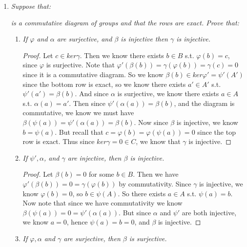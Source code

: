 \documentclass[9pt,reqno,twoside]{amsbook}
\theoremstyle{plain}
\numberwithin{section}{chapter}
\numberwithin{equation}{chapter}
\theoremstyle{definition}
\theoremstyle{remark}
\theoremstyle{plain}
\renewcommand{\phi}{\varphi}
\begin{document}
\begin{enumerate}[label=\arabic*.]
\item \textit{Suppose that: }
\begin{center}
\end{center}
\textit{is a commutative diagram of groups and that the rows are exact. Prove that: }
\begin{enumerate}
\item \textit{If $\phi$ and $\alpha$ are surjective, and $\beta$ is injective then $\gamma$ is injective. }
\begin{proof}
Let $c \in ker\gamma$. Then we know there exists $b \in B$ s.t. $\phi(b) = c$, since $\phi$ is surjective. Note that $\phi'(\beta(b)) = \gamma(\phi(b)) = \gamma(c) = 0$ since it is a commutative diagram. So we know $\beta(b) \in ker\phi' = \psi'(A')$ since the bottom row is exact, so we know there exists $a' \in A'$ s.t. $\psi'(a') = \beta(b)$. And since $\alpha$ is surjective, we know there exists $a \in A$ s.t. $\alpha(a) = a'$. Then since $\psi'(\alpha(a)) = \beta(b)$, and the diagram is commutative, we know we must have $\beta(\psi(a)) = \psi'(\alpha(a))  = \beta(b)$. Now since $\beta$ is injective, we know $b = \psi(a)$. But recall that $c = \phi(b) = \phi(\psi(a)) = 0$ since the top row is exact. Thus since $ker\gamma = 0 \in C$, we know that $\gamma$ is injective. 
\end{proof}

\item \textit{If $\psi',\alpha$, and $\gamma$ are injective, then $\beta$ is injective. }

\begin{proof}
Let $\beta(b) = 0$ for some $b \in B$. Then we have $\phi'(\beta(b)) = 0 = \gamma(\phi(b))$ by commutativity. Since $\gamma$ is injective, we know $\phi(b) = 0$, so $b \in \psi(A)$. So there exists $a \in A$ s.t. $\psi(a) = b$. Now note that since we have commutativity we know $\beta(\psi(a)) = 0 = \psi'(\alpha(a))$. But since $\alpha$ and $\psi'$ are both injective, we know $a = 0$, hence $\psi(a) = b = 0$, and $\beta$ is injective. 
\end{proof}

\item \textit{If $\phi,\alpha$ and $\gamma$ are surjective, then $\beta$ is surjective. }


\end{enumerate}
\end{enumerate}
\end{document}
